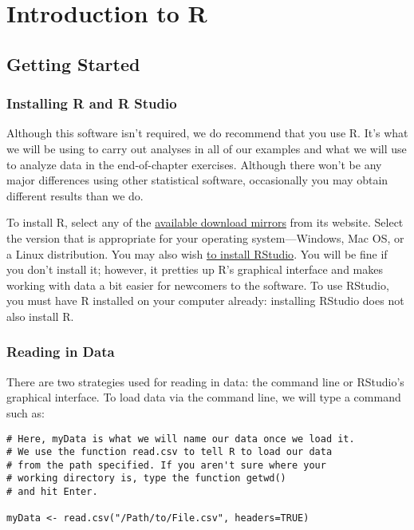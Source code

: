 
\chapter[Introduction to R]{Introduction to R}

\section{Getting Started}

\subsection{Installing R and R Studio}
Although this software isn't required, we do recommend that you use R. It's what we will be using to carry out analyses in all of our examples and what we will use to analyze data in the end-of-chapter exercises. Although there won't be any major differences using other statistical software, occasionally you may obtain different results than we do.

To install R, select any of the \href{http://cran.r-project.org/mirrors.html}{available download mirrors} from its website. Select the version that is appropriate for your operating system---Windows, Mac OS, or a Linux distribution. You may also wish \href{http://www.rstudio.com/}{to install RStudio}. You will be fine if you don't install it; however, it pretties up R's graphical interface and makes working with data a bit easier for newcomers to the software. To use RStudio, you must have R installed on your computer already: installing RStudio does not also install R.
	
\subsection{Reading in Data}
There are two strategies used for reading in data: the command line or RStudio's graphical interface. To load data via the command line, we will type a command such as:
\clearpage
\begin{framed}
\begin{Verbatim}[samepage=TRUE]
# Here, myData is what we will name our data once we load it.
# We use the function read.csv to tell R to load our data
# from the path specified. If you aren't sure where your
# working directory is, type the function getwd()
# and hit Enter.
 
myData <- read.csv("/Path/to/File.csv", headers=TRUE)
\end{Verbatim}
\end{framed}

